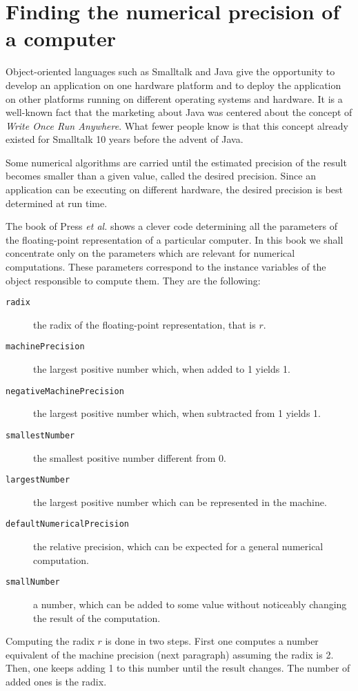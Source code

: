 \documentclass[twoside]{book}
\begin{document}
\section{Finding the numerical precision of a computer}
\label{sec:findprecision}
Object-oriented languages such as Smalltalk and Java give the
opportunity to develop an application on one hardware platform and
to deploy the application on other platforms running on different
operating systems and hardware. It is a well-known fact that the
marketing about Java was centered about the concept of {\sl Write
Once Run Anywhere}. What fewer people know is that this concept
already existed for Smalltalk 10 years before the advent of Java.

Some numerical algorithms are carried until the estimated
precision of the result becomes smaller than a given value, called
the desired precision. Since an application can be executing on
different hardware, the desired precision is best determined at
run time.

The book of Press {\it et al.} \cite{Press} shows a clever code
determining all the parameters of the floating-point
representation of a particular computer. In this book we shall
concentrate only on the parameters which are relevant for
numerical computations. These parameters correspond to the
instance variables of the object responsible to compute them. They
are the following:
\begin{description}
\item[{\tt radix}] the radix of the floating-point representation, that is $r$.
\item[{\tt machinePrecision}] the largest positive number which, when added to 1 yields 1.
\item[{\tt negativeMachinePrecision}] the largest positive number which, when subtracted from 1 yields 1.
\item[{\tt smallestNumber}] the smallest positive number different from 0.
\item[{\tt largestNumber}] the largest positive number which can be represented in the machine.
\item[{\tt defaultNumericalPrecision}] the relative precision, which can be expected for a general numerical computation.
\item[{\tt smallNumber}] a number, which can be added to some value without noticeably changing the result of the computation.
\end{description}
Computing the radix $r$ is done in two steps. First one computes a
number equivalent of the machine precision (\cf next paragraph)
assuming the radix is 2. Then, one keeps adding 1 to this number
until the result changes. The number of added ones is the radix.
\end{document}
